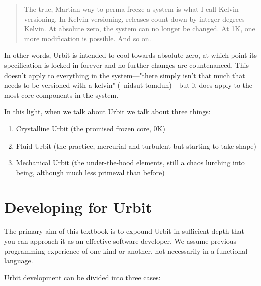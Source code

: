 {{{\begin{quote}
The true, Martian way to perma-freeze a system is what I call Kelvin versioning. In Kelvin versioning, releases count down by integer degrees Kelvin. At absolute zero, the system can no longer be changed. At 1K, one more modification is possible. And so on.
\end{quote}

In other words, Urbit is intended to cool towards absolute zero, at which point its specification is locked in forever and no further changes are countenanced.  This doesn't apply to everything in the system—"there simply isn't that much that needs to be versioned with a kelvin" (~nidsut-tomdun)—but it does apply to the most core components in the system.

In this light, when we talk about Urbit we talk about three things:
\begin{enumerate}
	\item  Crystalline Urbit (the promised frozen core, 0K)
  \item  Fluid Urbit (the practice, mercurial and turbulent but starting to take shape)
  \item  Mechanical Urbit (the under-the-hood elements, still a chaos lurching into being, although much less primeval than before)
\end{enumerate}


\section{Developing for Urbit}

The primary aim of this textbook is to expound Urbit in sufficient depth that you can approach it as an effective software developer.  We assume previous programming experience of one kind or another, not necessarily in a functional language.

Urbit development can be divided into three cases:

}}}
